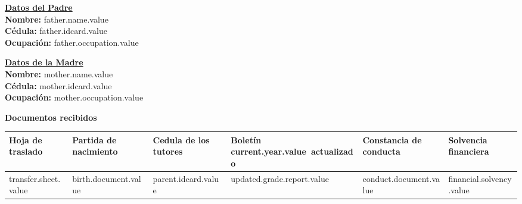 \documentclass[12pt]{article}
\newcommand{\aField}[1]{#1}
\newcommand{\fatherName}{father.name.value}
\newcommand{\fatherIdcard}{father.idcard.value}
\newcommand{\fatherOccupation}{father.occupation.value}
\newcommand{\motherName}{mother.name.value}
\newcommand{\motherIdcard}{mother.idcard.value}
\newcommand{\motherOccupation}{mother.occupation.value}
\newcommand{\currentYear}{current.year.value}
\newcommand{\transferSheet}{transfer.sheet.value}
\newcommand{\birthDocument}{birth.document.value}
\newcommand{\parentIdcard}{parent.idcard.value}
\newcommand{\updatedGradeReport}{updated.grade.report.value}
\newcommand{\conductDocument}{conduct.document.value}
\newcommand{\financialSolvency}{financial.solvency.value}
\begin{document}
    \par\vspace{4mm}
    \begin{minipage}[t]{0.48\textwidth}
        \textbf{\uline{Datos del Padre}}\\
        \textbf{Nombre:} \aField{\fatherName}\\
        \textbf{Cédula:} \aField{\fatherIdcard}\\
        \textbf{Ocupación:} \aField{\fatherOccupation}
    \end{minipage}
    \hfill
    \begin{minipage}[t]{0.48\textwidth}
        \textbf{\uline{Datos de la Madre}}\\
        \textbf{Nombre:} \aField{\motherName}\\
        \textbf{Cédula:} \aField{\motherIdcard}\\
        \textbf{Ocupación:} \aField{\motherOccupation}
    \end{minipage}   

    \par\vspace{8mm}
    \textbf{Documentos recibidos}
    \begin{table}[H]
        \centering
        \begin{tabular}{|p{1.8cm}|p{2.3cm}|p{2.2cm}|p{2.5cm}|p{2.5cm}|p{2cm}|}
            \hline
            Hoja de traslado &
            Partida de nacimiento &
            Cedula de los tutores &
            Boletín \currentYear\ actualizado &
            Constancia de conducta &
            Solvencia financiera\\
            \hline
            \hspace{6mm}\transferSheet &
            \hspace{9mm}\birthDocument &
            \hspace{9mm}\parentIdcard &
            \hspace{10mm}\updatedGradeReport &
            \hspace{10mm}\conductDocument &
            \hspace{7mm}\financialSolvency\\
            \hline
        \end{tabular}
    \end{table}
    
\end{document}
